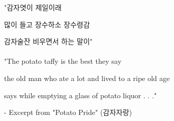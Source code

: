 
\vspace*{\fill}
\begin{center}
"감자엿이 제일이래

많이 들고 장수하소 장수령감

감자술잔 비우면서 하는 말이"
\\
\\
"The potato taffy is the best they say

  the old man who ate a lot and lived to a ripe old age

      says while emptying a glass of potato liquor . . ."
                                                                                         
                 - Excerpt from "Potato Pride" (감자자랑)
\end{center}
\vspace*{\fill}

